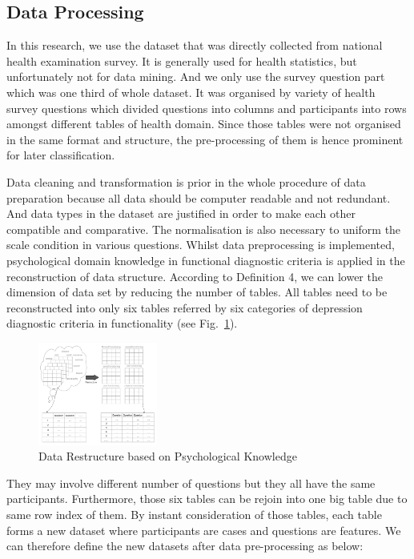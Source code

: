 \documentclass[10pt,journal,compsoc]{IEEEtran}
\begin{document}
\subsection{Data Processing}
In this research, we use the dataset that was directly collected from national health examination survey. It is generally used for health statistics, but unfortunately not for data mining. And we only use the survey question part which was one third of whole dataset. It was organised by variety of health survey questions which divided questions into columns and participants into rows amongst different tables of health domain. Since those tables were not organised in the same format and structure, the pre-processing of them is hence prominent for later classification. 

Data cleaning and transformation is prior in the whole procedure of data preparation because all data should be computer readable and not redundant. And data types in the dataset are justified in order to make each other compatible and comparative. The normalisation is also necessary to uniform the scale condition in various questions. Whilst data preprocessing is implemented, psychological domain knowledge in functional diagnostic criteria is applied in the reconstruction of data structure. According to Definition 4, we can lower the dimension of data set by reducing the number of tables. All tables need to be reconstructed into only six tables referred by six categories of depression diagnostic criteria in functionality (see Fig.~\ref{fig3}).
\begin{figure}[h]
\centering
\captionsetup{justification=centering}
\includegraphics[width=0.35\textwidth]{restructure.png}
\caption{Data Restructure based on Psychological Knowledge} \label{fig3}
\end{figure}
They may involve different number of questions but they all have the same participants. Furthermore, those six tables can be rejoin into one big table due to same row index of them. By instant consideration of those tables, each table forms a new dataset where participants are cases and questions are features. We can therefore define the new datasets after data pre-processing as below:\\
\end{document}
